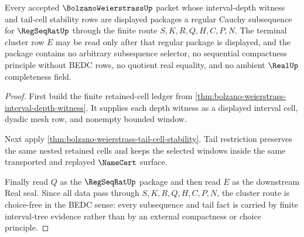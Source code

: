 \begin{theorem}
\label{thm:bolzano-weierstrass-choice-free-cluster-package}
Every accepted $\BolzanoWeierstrassUp$ packet whose interval-depth witness and tail-cell stability rows are displayed packages a regular Cauchy subsequence for $\RegSeqRatUp$ through the finite route $S,K,R,Q,H,C,P,N$. The terminal cluster row $E$ may be read only after that regular package is displayed, and the package contains no arbitrary subsequence selector, no sequential compactness principle without BEDC rows, no quotient real equality, and no ambient $\RealUp$ completeness field.
\end{theorem}
\begin{proof}
First build the finite retained-cell ledger from \autoref{thm:bolzano-weierstrass-interval-depth-witness}. It supplies each depth witness as a displayed interval cell, dyadic mesh row, and nonempty bounded window.

Next apply \autoref{thm:bolzano-weierstrass-tail-cell-stability}. Tail restriction preserves the same nested retained cells and keeps the selected windows inside the same transported and replayed $\NameCert$ surface.

Finally read $Q$ as the $\RegSeqRatUp$ package and then read $E$ as the downstream Real seal. Since all data pass through $S,K,R,Q,H,C,P,N$, the cluster route is choice-free in the BEDC sense: every subsequence and tail fact is carried by finite interval-tree evidence rather than by an external compactness or choice principle.
\end{proof}

